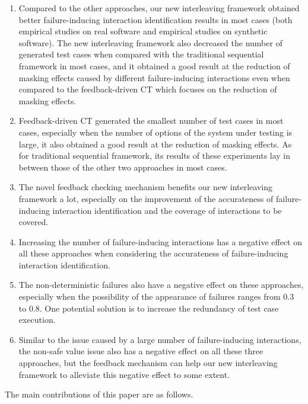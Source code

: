 \documentclass[journal,12pt,onecolumn,draftclsnofoot,]{IEEEtran}
\begin{document}
{\color{red}
 \begin{enumerate}
\item	Compared to the other approaches, our new interleaving framework obtained better failure-inducing interaction identification results in most cases (both empirical studies on real software and empirical studies on synthetic software).  The new interleaving framework also decreased the number of generated test cases when compared with the traditional sequential framework in most cases, and it obtained a good result at the reduction of masking effects caused by different failure-inducing interactions even when compared to the feedback-driven CT which focuses on the reduction of masking effects.
\item Feedback-driven CT generated the smallest number of test cases in most cases, especially when the number of options of the system under testing is large, it also obtained a good result at the reduction of masking effects. As for traditional sequential framework, its results of these experiments lay in between those of the other two approaches in most cases.
\item	The novel feedback checking mechanism benefits our new interleaving framework a lot, especially on the improvement of the accurateness of  failure-inducing interaction identification and the coverage of interactions to be covered.
\item	Increasing the number of failure-inducing interactions has a negative effect on all these approaches when considering the accurateness of failure-inducing interaction identification.
\item	The non-deterministic failures also have a negative effect on these approaches, especially when the possibility of the appearance of failures ranges from 0.3 to 0.8. One potential solution is to increase the redundancy of test case execution.
\item	Similar to the issue caused by a large number of failure-inducing interactions, the non-safe value issue also has a negative effect on all these three approaches, but the feedback mechanism can help our new interleaving framework to alleviate this negative effect to some extent.
\end{enumerate}
}


The main contributions of this paper are as follows.
\end{document}
